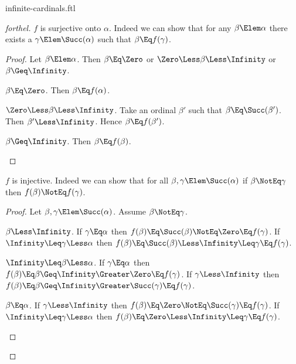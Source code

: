 \documentclass{stex}
\begin{document}
\begin{smodule}{infinite-cardinals.ftl}
\begin{proof}[forthel]
  $f$ is surjective onto $\alpha$.
  Indeed we can show that for any $\beta \Elem \alpha$ there exists a
  $\gamma \Elem \Succ(\alpha)$ such that $\beta \Eq f(\gamma)$.
  \begin{proof}
    Let $\beta \Elem \alpha$.
    Then $\beta \Eq \Zero$ or $\Zero \Less \beta \Less \Infinity$ or $\beta \Geq \Infinity$.

    \begin{case}{$\beta \Eq \Zero$.}
      Then $\beta \Eq f(\alpha)$.
    \end{case}

    \begin{case}{$\Zero \Less \beta \Less \Infinity$.}
      Take an ordinal $\beta'$ such that $\beta \Eq \Succ(\beta')$.
      Then $\beta' \Less \Infinity$.
      Hence $\beta \Eq f(\beta')$.
    \end{case}

    \begin{case}{$\beta \Geq \Infinity$.}
      Then $\beta \Eq f(\beta)$.
    \end{case}
  \end{proof}

  $f$ is injective.
  Indeed we can show that for all $\beta, \gamma \Elem \Succ(\alpha)$ if
  $\beta \NotEq \gamma$ then $f(\beta) \NotEq f(\gamma)$.
  \begin{proof}
    Let $\beta, \gamma \Elem \Succ(\alpha)$.
    Assume $\beta \NotEq \gamma$.

    \begin{case}{$\beta \Less \Infinity$.}
      If $\gamma \Eq \alpha$ then
      $f(\beta)
        \Eq \Succ(\beta)
        \NotEq \Zero
        \Eq f(\gamma)$.
      If $\Infinity \Leq \gamma \Less \alpha$ then
      $f(\beta)
        \Eq \Succ(\beta)
        \Less \Infinity
        \Leq \gamma
        \Eq f(\gamma)$.
    \end{case}

    \begin{case}{$\Infinity \Leq \beta \Less \alpha$.}
      If $\gamma \Eq \alpha$ then
      $f(\beta)
        \Eq \beta
        \Geq \Infinity
        \Greater \Zero
        \Eq f(\gamma)$.
      If $\gamma \Less \Infinity$ then
      $f(\beta)
        \Eq \beta
        \Geq \Infinity
        \Greater \Succ(\gamma)
        \Eq f(\gamma)$.
    \end{case}

    \begin{case}{$\beta \Eq \alpha$.}
      If $\gamma \Less \Infinity$ then
      $f(\beta)
        \Eq \Zero
        \NotEq \Succ(\gamma)
        \Eq f(\gamma)$.
      If $\Infinity \Leq \gamma \Less \alpha$ then
      $f(\beta)
        \Eq \Zero
        \Less \Infinity
        \Leq \gamma
        \Eq f(\gamma)$.
    \end{case}
  \end{proof}


\end{proof}
\end{smodule}
\end{document}
